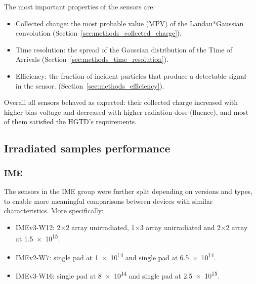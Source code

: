 The most important properties of the sensors are:

\begin{itemize}
    \item Collected change: the most probable value (MPV) of the Landau*Gaussian convolution (Section~\ref{sec:methods_collected_charge}).
    \item Time resolution: the spread of the Gaussian distribution of the Time of Arrivals (Section~\ref{sec:methods_time_resolution}).
    \item Efficiency: the fraction of incident particles that produce a detectable signal in the sensor. (Section~\ref{sec:methods_efficiency}).
\end{itemize}

Overall all sensors behaved as expected: their collected charge increased with higher bias voltage and decreased with higher radiation dose (fluence), and most of them satisfied the HGTD's requirements.

\subsection{Irradiated samples performance}

\subsubsection{IME}

The sensors in the IME group were further split depending on versions and types, to enable more meaningful comparisons between devices with similar characteristics. More specifically:

\begin{itemize}
    \item IMEv3-W12: 2\(\times\)2 array unirradiated, 1\(\times\)3 array unirradiated and 2\(\times\)2 array at \qty{1.5e15}{\neutroneq}.
    \item IMEv2-W7: single pad at \qty{1e14}{\neutroneq} and single pad at \qty{6.5e14}{\neutroneq}.
    \item IMEv3-W16: single pad at \qty{8e14}{\neutroneq} and single pad at \qty{2.5e15}{\neutroneq}.
\end{itemize}

